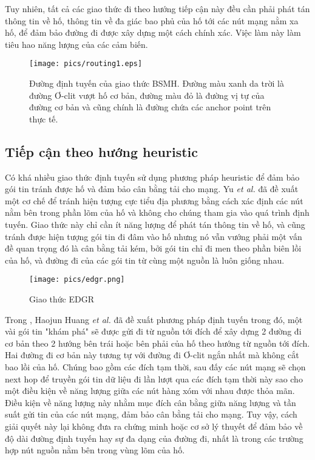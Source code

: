 \documentclass[12pt]{report}
\begin{document}
Tuy nhiên, tất cả các giao thức đi theo hướng tiếp cận này đều cần phải phát tán thông tin về hố, thông tin về đa giác bao phủ của hố tới các nút mạng nằm xa hố, để đảm bảo đường đi được xây dựng một cách chính xác. Việc làm này làm tiêu hao năng lượng của các cảm biến. 
\begin{figure}[H]
\centering
\texttt{[image: pics/routing1.eps]}
\caption[Đường định tuyến của giao thức BSMH]{Đường định tuyến của giao thức BSMH. Đường màu xanh da trời là đường Ơ-clit vượt hố cơ bản, đường màu đỏ là đường vị tự của đường cơ bản và cũng chính là đường chứa các anchor point trên thực tế.}
\end{figure}
\label{sec:2.2.2}

\subsection{Tiếp cận theo hướng heuristic}
\label{sec:2.2.4}
Có khá nhiều giao thức định tuyến sử dụng phương pháp heuristic để đảm bảo gói tin tránh được hố và đảm bảo cân bằng tải cho mạng. Yu \textit{et al.} \cite{holeplastic} đã đề xuất một cơ chế để tránh hiện tượng cực tiểu địa phương bằng cách xác định các nút nằm bên trong phần lõm của hố và không cho chúng tham gia vào quá trình định tuyến. Giao thức này chỉ cần ít năng lượng để phát tán thông tin về hố, và cũng tránh được hiện tượng gói tin đi đâm vào hố nhưng nó vẫn vướng phải một vấn đề quan trọng đó là cân bằng tải kém, bởi gói tin chỉ đi men theo phần biên lồi của hố, và đường đi của các gói tin từ cùng một nguồn là luôn giống nhau.
\begin{figure}[H]
\centering
\texttt{[image: pics/edgr.png]}
\caption{Giao thức EDGR}
\end{figure}
Trong \cite{edgr}, Haojun Huang \textit{et al.} đã đề xuất phương pháp định tuyến trong đó, một vài gói tin "khám phá" sẽ được gửi đi từ nguồn tới đích để xây dựng 2 đường đi cơ bản theo 2 hướng bên trái hoặc bên phải của hố theo hướng từ nguồn tới đích. Hai đường đi cơ bản này tương tự với đường đi Ơ-clit ngắn nhất mà không cắt bao lồi của hố. Chúng bao gồm các đích tạm thời, sau đấy các nút mạng sẽ chọn next hop để truyền gói tin dữ liệu đi lần lượt qua các đích tạm thời này sao cho một điều kiện về năng lượng giữa các nút hàng xóm với nhau được thỏa mãn. Điều kiện về năng lượng này nhằm mục đích cân bằng giữa năng lượng và tần suất gửi tin của các nút mạng, đảm bảo cân bằng tải cho mạng. Tuy vậy, cách giải quyết này lại không đưa ra chứng minh hoặc cơ sở lý thuyết để đảm bảo về độ dài đường định tuyến hay sự đa dạng của đường đi, nhất là trong các trường hợp nút nguồn nằm bên trong vùng lõm của hố.\\ \\ 
\end{document}
